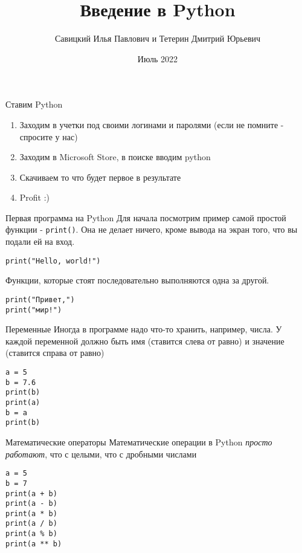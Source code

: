\documentclass[hyperref=unicode, aspectratio=169]{beamer}
\title{Введение в Python}
\author[]{Савицкий Илья Павлович и Тетерин Дмитрий Юрьевич}
\date[]{Июль 2022}
\begin{document}
\maketitle

\begin{frame}{Ставим Python}
    \begin{enumerate}
        \item Заходим в учетки под своими логинами и паролями (если не помните - спросите у нас)
        \item Заходим в Microsoft Store, в поиске вводим python
        \item Скачиваем то что будет первое в результате
        \item Profit :)
    \end{enumerate}
\end{frame}

\begin{frame}[fragile]{Первая программа на Python}
    Для начала посмотрим пример самой простой функции - \texttt{print()}. Она не делает ничего, кроме вывода на экран того, что вы подали ей на вход.
    \begin{example}
        \begin{verbatim}
print("Hello, world!")
        \end{verbatim}    
    \end{example}
    Функции, которые стоят последовательно выполняются одна за другой.
    \begin{example}
        \begin{verbatim}
print("Привет,")
print("мир!")
        \end{verbatim}    
    \end{example}
\end{frame}

\begin{frame}[fragile]{Переменные}
    Иногда в программе надо что-то хранить, например, числа. У каждой переменной должно быть имя (ставится слева от равно) и значение (ставится справа от равно)
    \begin{example}
        \begin{verbatim}
a = 5
b = 7.6
print(b)
print(a)
b = a
print(b)
        \end{verbatim}    
    \end{example}
    
\end{frame}

\begin{frame}[fragile]{Математические операторы}
    Математические операции в Python \textit{просто работают}, что с целыми, что с дробными числами
    \begin{example}
        \begin{verbatim}
a = 5
b = 7
print(a + b)
print(a - b)
print(a * b)
print(a / b)
print(a % b)
print(a ** b)
        \end{verbatim}    
    \end{example}
\end{frame}
\end{document}
